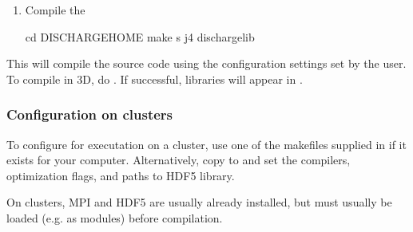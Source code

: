 \documentclass[letterpaper,10pt,english]{sphinxmanual}
\begin{document}
\begin{enumerate}
\begin{itemize}
\item {} 
\sphinxAtStartPar
{}:

\begin{sphinxVerbatim}[commandchars=\\\{\},formatcom=\scriptsize]
cp \PYGZdl{}DISCHARGE\PYGZus{}HOME/Lib/Local/Make.defs.MPI.HDF5.GNU \PYGZdl{}CHOMBO\PYGZus{}HOME/mk/Make.defs.local
\end{sphinxVerbatim}

\end{itemize}

\item {} 
\sphinxAtStartPar
Compile the 

\begin{sphinxVerbatim}[commandchars=\\\{\},formatcom=\scriptsize]
cd \PYGZdl{}DISCHARGE\PYGZus{}HOME
make \PYGZhy{}s \PYGZhy{}j4 discharge\PYGZhy{}lib
\end{sphinxVerbatim}

\end{enumerate}

\sphinxAtStartPar
This will compile the  source code using the configuration settings set by the user.
To compile  in 3D, do .
If successful,  libraries will appear in .


\subsubsection{Configuration on clusters}
\label{\detokenize{Base/Installation:configuration-on-clusters}}
\sphinxAtStartPar
To configure  for executation on a cluster, use one of the makefiles supplied in  if it exists for your computer.
Alternatively, copy  to  and set the compilers, optimization flags, and paths to HDF5 library.

\sphinxAtStartPar
On clusters, MPI and HDF5 are usually already installed, but must usually be loaded (e.g. as modules) before compilation.
\end{document}
